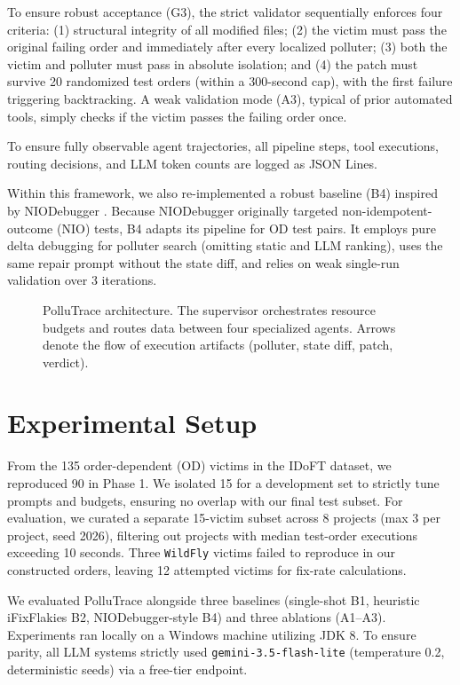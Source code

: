 \documentclass[conference]{IEEEtran}
\begin{document}
To ensure robust acceptance (G3), the strict validator sequentially enforces four criteria: (1) structural integrity of all modified files; (2) the victim must pass the original failing order and immediately after every localized polluter; (3) both the victim and polluter must pass in absolute isolation; and (4) the patch must survive 20 randomized test orders (within a 300-second cap), with the first failure triggering backtracking. A weak validation mode (A3), typical of prior automated tools, simply checks if the victim passes the failing order once.

To ensure fully observable agent trajectories, all pipeline steps, tool executions, routing decisions, and LLM token counts are logged as JSON Lines.

Within this framework, we also re-implemented a robust baseline (B4) inspired by NIODebugger \cite{ke2025niodebugger}. Because NIODebugger originally targeted non-idempotent-outcome (NIO) tests, B4 adapts its pipeline for OD test pairs. It employs pure delta debugging \cite{zeller2002dd} for polluter search (omitting static and LLM ranking), uses the same repair prompt without the state diff, and relies on weak single-run validation over 3 iterations.
\begin{figure}[t]
  \centering
  
  \caption{PolluTrace architecture. The supervisor orchestrates resource budgets and routes data between four specialized agents. Arrows denote the flow of execution artifacts (polluter, state diff, patch, verdict).}
  \label{fig:arch}
\end{figure}

\section{Experimental Setup}
\label{sec:setup}
From the 135 order-dependent (OD) victims in the IDoFT dataset, we reproduced 90 in Phase 1. We isolated 15 for a development set to strictly tune prompts and budgets, ensuring no overlap with our final test subset. For evaluation, we curated a separate 15-victim subset across 8 projects (max 3 per project, seed 2026), filtering out projects with median test-order executions exceeding 10 seconds. Three \texttt{WildFly} victims failed to reproduce in our constructed orders, leaving 12 attempted victims for fix-rate calculations.

We evaluated PolluTrace alongside three baselines (single-shot B1, heuristic iFixFlakies B2, NIODebugger-style B4) and three ablations (A1–A3). Experiments ran locally on a Windows machine utilizing JDK 8. To ensure parity, all LLM systems strictly used \texttt{gemini-3.5-flash-lite} (temperature 0.2, deterministic seeds) via a free-tier endpoint.
\end{document}

